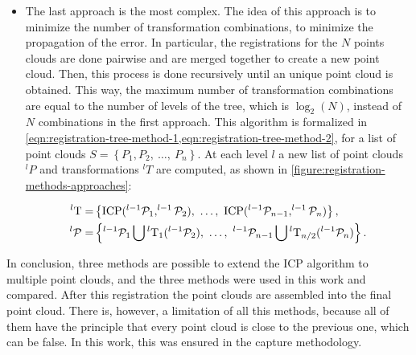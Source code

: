 \begin{itemize}
    \item The last approach is the most complex. The idea of this approach is to minimize the number of transformation combinations, to minimize the propagation of the error. In particular, the registrations for the $N$ points clouds are done pairwise and are merged together to create a new point cloud. Then, this process is done recursively until an unique point cloud is obtained. This way, the maximum number of transformation combinations are equal to the number of levels of the tree, which is $\log_2(N)$, instead of $N$ combinations in the first approach. This algorithm is formalized in \cref{eqn:registration-tree-method-1,eqn:registration-tree-method-2}, for a list of point clouds $S=\left\{P_1, P_2, \ \dots, \ P_n\right\}$. At each level $l$ a new list of point clouds $^{l}P$ and transformations $^{l}T$ are computed, as shown in \cref{figure:registration-methods-approaches}:

    \begin{align}
        ^{l}\T = & \left\{\textrm{ICP}(^{l-1}\Pt_1, ^{l-1}\Pt_2), \ \dots, \ \textrm{ICP}(^{l-1}\Pt_{n-1}, ^{l-1}\Pt_{n}) \right\},
            \label{eqn:registration-tree-method-1} \\
        ^{l}\Pt = & \left\{^{l-1}\Pt_1 \bigcup{^{l}\T_1(^{l-1}\Pt_2}), \ \dots, \ ^{l-1}\Pt_{n-1} \bigcup{^{l}\T_{n/2}(^{l-1}\Pt_n)}\right\}.
            \label{eqn:registration-tree-method-2}
    \end{align}
    
\end{itemize}

In conclusion, three methods are possible to extend the ICP algorithm to multiple point clouds, and the three methods were used in this work and compared. After this registration the point clouds are assembled into the final point cloud. There is, however, a limitation of all this methods, because all of them have the principle that every point cloud is close to the previous one, which can be false. In this work, this was ensured in the capture methodology. 

